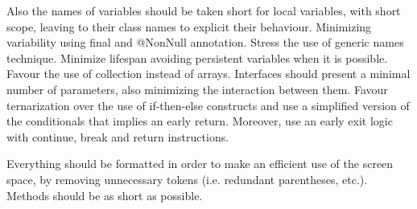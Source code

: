 Also the names of variables should be taken short for local variables, with short scope, 
leaving to their class names to explicit their behaviour. Minimizing variability using 
final and @NonNull annotation. Stress the use of generic names technique. Minimize lifespan 
avoiding persistent variables when it is possible. Favour the use of collection instead 
of arrays. Interfaces should present a minimal number of parameters, also minimizing 
the interaction between them. Favour ternarization over the use of if-then-else constructs 
and use a simplified version of the conditionals that implies an early return. Moreover, 
use an early exit logic with continue, break and return instructions. 

Everything should be formatted in order to make an efficient use of the screen space, 
by removing unnecessary tokens (i.e. redundant parentheses, etc.). 
Methods should be as short as possible. 

